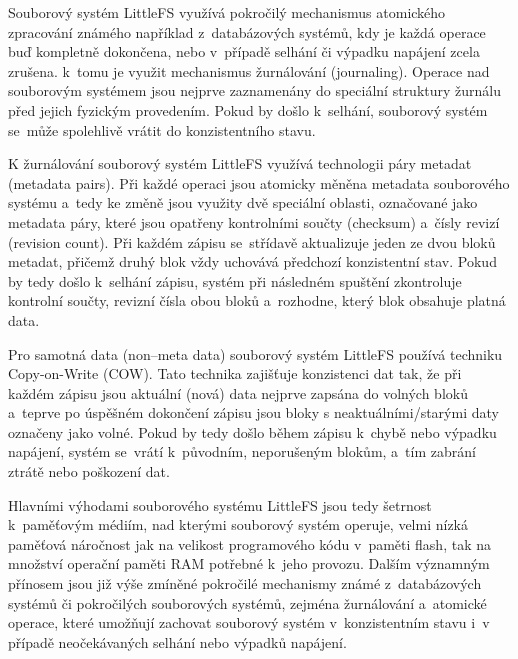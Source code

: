 
Souborový systém LittleFS využívá pokročilý mechanismus atomického zpracování známého například z~databázových systémů, kdy je každá operace buď kompletně dokončena, nebo v~případě selhání či výpadku napájení zcela zrušena. k~tomu je využit mechanismus žurnálování (journaling). Operace nad souborovým systémem jsou nejprve zaznamenány do speciální struktury žurnálu před jejich fyzickým provedením. Pokud by došlo k~selhání, souborový systém se~může spolehlivě vrátit do konzistentního stavu.~\cite{nxp_the_design_of_the_little_filesystem}

K žurnálování souborový systém LittleFS využívá technologii páry metadat (metadata pairs). Při každé operaci jsou atomicky měněna metadata souborového systému a~tedy ke změně jsou využity dvě speciální oblasti, označované jako metadata páry, které jsou opatřeny kontrolními součty (checksum) a~čísly revizí (revision count). Při každém zápisu se~střídavě aktualizuje jeden ze dvou bloků metadat, přičemž druhý blok vždy uchovává předchozí konzistentní stav. Pokud by tedy došlo k~selhání zápisu, systém při následném spuštění zkontroluje kontrolní součty, revizní čísla obou bloků a~rozhodne, který blok obsahuje platná data.~\cite{nxp_the_design_of_the_little_filesystem}

Pro samotná data (non--meta data) souborový systém LittleFS používá techniku Copy-on-Write (COW). Tato technika zajišťuje konzistenci dat tak, že při každém zápisu jsou aktuální (nová) data nejprve zapsána do volných bloků a~teprve po úspěšném dokončení zápisu jsou bloky s neaktuálními/starými daty označeny jako volné. Pokud by tedy došlo během zápisu k~chybě nebo výpadku napájení, systém se~vrátí k~původním, neporušeným blokům, a~tím zabrání ztrátě nebo poškození dat.~\cite{nxp_the_design_of_the_little_filesystem}

Hlavními výhodami souborového systému LittleFS jsou tedy šetrnost k~paměťovým médiím, nad kterými souborový systém operuje, velmi nízká paměťová náročnost jak na velikost programového kódu v~paměti flash, tak na množství operační paměti RAM potřebné k~jeho provozu. Dalším významným přínosem jsou již výše zmíněné pokročilé mechanismy známé z~databázových systémů či pokročilých souborových systémů, zejména žurnálování a~atomické operace, které umožňují zachovat souborový systém v~konzistentním stavu i~v případě neočekávaných selhání nebo výpadků napájení.~\cite{nxp_the_design_of_the_little_filesystem}

